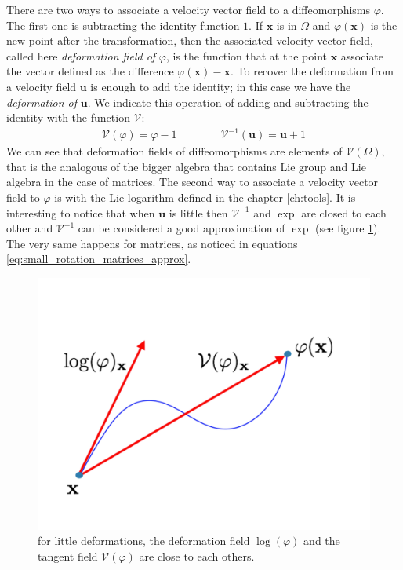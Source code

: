There are two ways to associate a velocity vector field to a diffeomorphisms $\varphi$. The first one is subtracting the identity function $1$. If $\mathbf{x}$ is in $\Omega$ and $\varphi(\mathbf{x})$ is the new point after the transformation, then the associated velocity vector field, called here \emph{deformation field of} $\varphi$, is the function that at the point $\mathbf{x}$ associate the vector defined as the difference $\varphi(\mathbf{x}) - \mathbf{x}$. To recover the deformation from a velocity field $\mathbf{u}$ is enough to add the identity; in this case we have the \emph{deformation of} $\mathbf{u}$. We indicate this operation of adding and subtracting the identity with the function $\mathcal{V}$:
\begin{align*}
\mathcal{V}(\varphi) = \varphi - 1 
\qquad \qquad
\mathcal{V}^{-1}(\mathbf{u}) = \mathbf{u} + 1 
\end{align*}
We can see that deformation fields of diffeomorphisms are elements of $\mathcal{V}(\Omega)$, that is the analogous of the bigger algebra that contains Lie group and Lie algebra in the case of matrices.
The second way to associate a velocity vector field to $\varphi$ is with the Lie logarithm defined in the chapter \ref{ch:tools}. It is interesting to notice that when $\mathbf{u}$ is little then $\mathcal{V}^{-1}$ and $\exp$ are closed to each other and $\mathcal{V}^{-1}$ can be considered a good approximation of $\exp$ (see figure \ref{fig:exp_versus_v}). The very same happens for matrices, as noticed in equations \ref{eq:small_rotation_matrices_approx}.

\begin{figure}[!ht]
	\centering
	\includegraphics[scale=0.25]{figures/exp_versus_v.pdf}
	\caption{for little deformations, the deformation field $\log(\varphi)$ and the tangent field $\mathcal{V}(\varphi)$ are close to each others.}
	\label{fig:exp_versus_v}
\end{figure}

